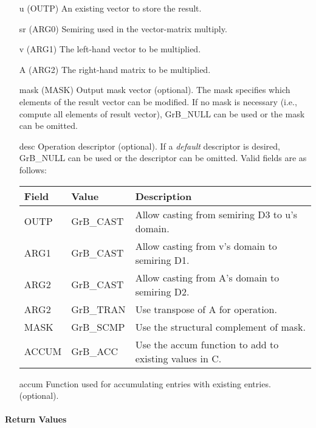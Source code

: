 \begin{itemize}[leftmargin=1.1in]
    \item[{\sf u}]    ({\sf OUTP}) An existing vector to store the result.
    \item[{\sf sr}]   ({\sf ARG0}) Semiring used in the vector-matrix multiply.
    \item[{\sf v}]    ({\sf ARG1}) The left-hand vector to be multiplied.
    \item[{\sf A}]    ({\sf ARG2}) The right-hand matrix to be multiplied.

    \item[{\sf mask}] ({\sf MASK}) Output mask vector (optional). The mask
    specifies which elements of the result vector can be modified.
    If no mask is necessary (i.e., compute all elements of result
    vector), {\sf GrB\_NULL} can be used or the mask can be omitted.

    \item[{\sf desc}]  Operation descriptor (optional). If a
    \emph{default} descriptor is desired, {\sf GrB\_NULL} can be
    used or the descriptor can be omitted. Valid fields are as follows: \\
    \begin{tabular}{lll}
    Field  & Value & Description \\
    \hline
    {\sf OUTP} & {\sf GrB\_CAST} & Allow casting from semiring D3 to {\sf u}'s domain. \\
    {\sf ARG1} & {\sf GrB\_CAST} & Allow casting from {\sf v}'s domain to semiring D1. \\
    {\sf ARG2} & {\sf GrB\_CAST} & Allow casting from {\sf A}'s domain to semiring D2. \\
    {\sf ARG2} & {\sf GrB\_TRAN} & Use transpose of {\sf A} for operation. \\
    {\sf MASK} & {\sf GrB\_SCMP} & Use the structural complement of {\sf mask}. \\
    {\sf ACCUM}& {\sf GrB\_ACC}  & Use the {\sf accum} function to add to existing values in {\sf C}.\\
    \end{tabular}

  	\item[{\sf accum}]  Function used for accumulating entries with existing  entries. (optional). 
\end{itemize}

\paragraph{Return Values}

